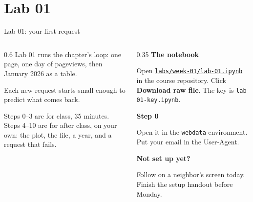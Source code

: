 \documentclass[9pt,aspectratio=169]{beamer}
\begin{document}
\section{Lab 01}

\begin{frame}{Lab 01: your first request}
    \begin{columns}[T]
        \begin{column}{0.6\textwidth}
            Lab 01 runs the chapter's loop: one page, one day of pageviews, then January 2026 as a table.

            \medskip
            Each new request starts small enough to predict what comes back.

            \medskip
            Steps 0--3 are for class, 35 minutes. Steps 4--10 are for after class, on your own: the plot, the file, a year, and a request that fails.
        \end{column}
        \begin{column}{0.35\textwidth}
            \textbf{The notebook}\\[2pt]
            {\footnotesize Open \href{https://github.com/cuinfoscience/INFO4617-Fall2026/blob/main/labs/week-01/lab-01.ipynb}{\texttt{labs/week-01/lab-01.ipynb}} in the course repository. Click \textbf{Download raw file}. The key is \texttt{lab-01-key.ipynb}.\par}
            \medskip
            \textbf{Step 0}\\[2pt]
            {\footnotesize Open it in the \texttt{webdata} environment. Put your email in the User-Agent.\par}
            \medskip
            \textbf{Not set up yet?}\\[2pt]
            {\footnotesize Follow on a neighbor's screen today. Finish the setup handout before Monday.\par}
        \end{column}
    \end{columns}
\end{frame}
\end{document}
